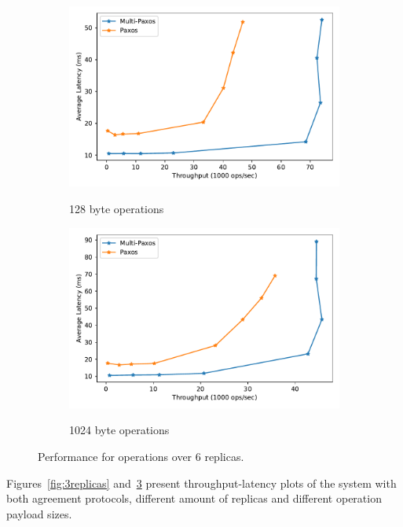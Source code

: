 \documentclass[sigconf]{acmart}
\begin{document}
\begin{figure}[htp]
    
\begin{subfigure}{\linewidth}
    \centering
    \caption{128 byte operations}
    \includegraphics[width=\textwidth]{6R_128B.pdf}
    \label{fig:6replicas-128}
\end{subfigure}

\begin{subfigure}{\linewidth}
    \centering
    \caption{1024 byte operations}
    \includegraphics[width=\textwidth]{6R_1024B.pdf}
    \label{fig:6replicas-1024}
\end{subfigure}

\caption{Performance for operations over 6 replicas.}
\label{fig:6replicas}

\end{figure}

Figures~\ref{fig:3replicas} and~\ref{fig:6replicas} present throughput-latency plots of the system with both agreement protocols, different amount of replicas and different operation payload sizes. 
\end{document}
